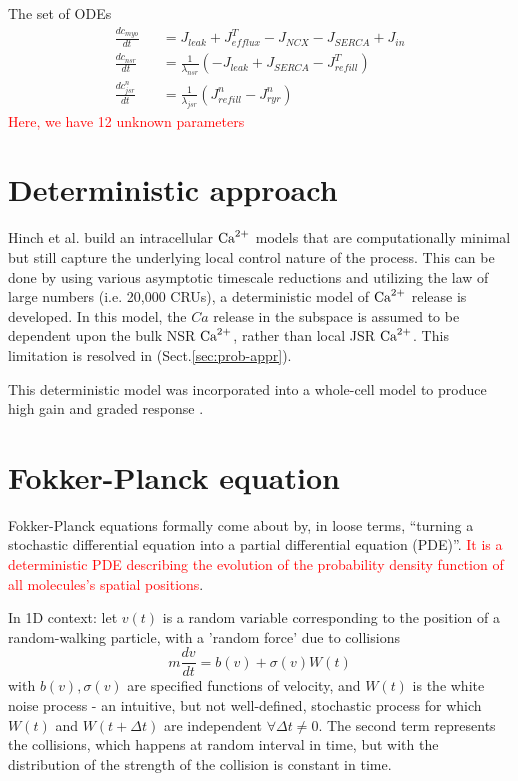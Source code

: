 The set of ODEs
\begin{eqnarray}
  \label{eq:2300}
  \frac{dc_{myo}}{dt} &&=  J_{leak}+J^T_{efflux} - J_{NCX} - J_{SERCA} +
  J_{in} \\
  \frac{dc_{nsr}}{dt} &&= \frac{1}{\lambda_{nsr}} \left( -J_{leak} +
    J_{SERCA} - J^T_{refill} \right)\\
  \frac{dc^n_{jsr}}{dt} &&= \frac{1}{\lambda_{jsr}} \left( J^n_{refill} -J^n_{ryr} \right)
\end{eqnarray}
\textcolor{red}{Here, we have 12 unknown parameters} 


\section{Deterministic approach}
\label{sec:deterministic_approach}

Hinch et al. \citep{hinch2004mag,hinch2004mag} build an intracellular ${\text{Ca}^{2+}}$
models that are computationally minimal but still capture the underlying local
control nature of the process. This can be done by using various asymptotic
timescale reductions and utilizing the law of large numbers (i.e. 20,000 CRUs),
a deterministic model of ${\text{Ca}^{2+}}$ release is developed. In this model, the
$Ca$ release in the subspace is assumed to be dependent upon the bulk
NSR ${\text{Ca}^{2+}}$, rather than local JSR ${\text{Ca}^{2+}}$. This limitation is resolved in
\citep{williams2008mlg} (Sect.\ref{sec:prob-appr}).

This deterministic model was incorporated into a whole-cell model to produce
high gain and graded response \citep{hinch2004slc,greenstein2006}.


\section{Fokker-Planck equation}
\label{sec:Fokker-Planck_equation}

Fokker-Planck equations formally come about by, in loose terms, ``turning a
stochastic differential equation into a partial differential equation (PDE)''.
\textcolor{red}{It is a deterministic PDE describing the evolution of the
probability density function of all molecules's spatial positions}.

In 1D context: let $v(t)$ is a random variable corresponding to the position of
a random-walking particle, with a 'random force' due to collisions
\begin{equation}
m\frac{dv}{dt} = b(v) + \sigma(v) W(t)
\end{equation}
with $b(v), \sigma(v)$ are specified functions of velocity, and $W(t)$ is the
white noise process - an intuitive, but not well-defined, stochastic process
for which $W(t)$ and $W(t+\Delta t)$ are independent $\forall \Delta t \ne 0$.
The second term represents the collisions, which happens at random interval in
time, but with the distribution of the strength of the collision is constant in
time.

